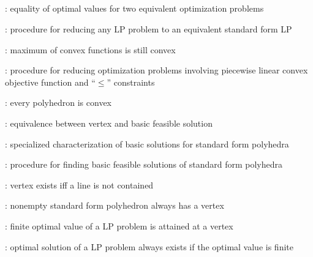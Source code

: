 \subsection*{}
\item {}: equality of optimal values for two equivalent optimization problems
\item {}: procedure for reducing any LP problem to an equivalent standard form LP
\item {}: maximum of convex functions is still convex
\item {}: procedure for reducing optimization problems involving piecewise linear convex objective function and ``\(\leq\)'' constraints
\item {}: every polyhedron is convex
\item {}: equivalence between vertex and basic feasible solution
\item {}: specialized characterization of basic solutions for standard form polyhedra
\item {}: procedure for finding basic feasible solutions of standard form polyhedra
\item {}: vertex exists iff a line is not contained
\item {}: nonempty standard form polyhedron always has a vertex
\item {}: finite optimal value of a LP problem is attained at a vertex
\item {}: optimal solution of a LP problem always exists if the optimal value is finite
